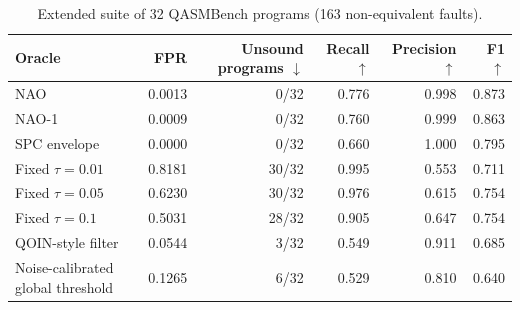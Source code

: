 \begin{table}[t]
\centering
\caption{Extended suite of 32 QASMBench programs (163 non-equivalent faults).}
\label{tab:ext-suite}
\small
\begin{tabular}{lrrrrr}
\toprule
Oracle & FPR & Unsound programs $\downarrow$ & Recall $\uparrow$ & Precision $\uparrow$ & F1 $\uparrow$ \\
\midrule
NAO & 0.0013 & 0/32 & 0.776 & 0.998 & 0.873 \\
NAO-1 & 0.0009 & 0/32 & 0.760 & 0.999 & 0.863 \\
SPC envelope & 0.0000 & 0/32 & 0.660 & 1.000 & 0.795 \\
Fixed $\tau=0.01$ & 0.8181 & 30/32 & 0.995 & 0.553 & 0.711 \\
Fixed $\tau=0.05$ & 0.6230 & 30/32 & 0.976 & 0.615 & 0.754 \\
Fixed $\tau=0.1$ & 0.5031 & 28/32 & 0.905 & 0.647 & 0.754 \\
QOIN-style filter & 0.0544 & 3/32 & 0.549 & 0.911 & 0.685 \\
Noise-calibrated global threshold & 0.1265 & 6/32 & 0.529 & 0.810 & 0.640 \\
\bottomrule
\end{tabular}
\end{table}
